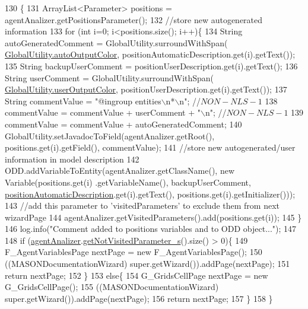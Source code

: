 \begin{DoxyCode}
130                                     \{ 
131         ArrayList<Parameter> positions = agentAnalizer.getPositionsParameter();
132         \textcolor{comment}{//store new autogenerated information}
133         \textcolor{keywordflow}{for} (\textcolor{keywordtype}{int} i=0; i<positions.size(); i++)\{
134             String autoGeneratedComment = GlobalUtility.surroundWithSpan(
      \hyperlink{classit_1_1isislab_1_1masonhelperdocumentation_1_1analizer_1_1_global_utility_a42aa676ad1ff27c42cd4aab651ff2a35}{GlobalUtility.autoOutputColor}, positionAutomaticDescription.get(i).getText());
135             String backupUserComment = positionUserDescription.get(i).getText();
136             String userComment = GlobalUtility.surroundWithSpan(
      \hyperlink{classit_1_1isislab_1_1masonhelperdocumentation_1_1analizer_1_1_global_utility_aec864cd710b27ece609c5a6093211ff4}{GlobalUtility.userOutputColor}, positionUserDescription.get(i).getText());
137             String commentValue = \textcolor{stringliteral}{"@ingroup entities\(\backslash\)n*\(\backslash\)n"}; \textcolor{comment}{//$NON-NLS-1$}
138             commentValue = commentValue + userComment + \textcolor{stringliteral}{"\(\backslash\)n"}; \textcolor{comment}{//$NON-NLS-1$}
139             commentValue = commentValue + autoGeneratedComment;
140             GlobalUtility.setJavadocToField(agentAnalizer.getRoot(), positions.get(i).getField(), 
      commentValue);
141             \textcolor{comment}{//store new autogenerated/user information in model description}
142             ODD.addVariableToEntity(agentAnalizer.getClassName(), \textcolor{keyword}{new} Variable(positions.get(i)
      .getVariableName(), backupUserComment, \hyperlink{classit_1_1isislab_1_1masonhelperdocumentation_1_1mason_1_1wizards_1_1_e___agent_position_page_ad8c6b4b4f5efd73f4e653ddeddd6bc2d}{positionAutomaticDescription}.get(i).getText(), 
      positions.get(i).getInitializer()));
143             \textcolor{comment}{//add this parameter to 'visitedParameters' to exclude them from next wizardPage}
144             agentAnalizer.getVisitedParameters().add(positions.get(i));
145         \}
146         log.info(\textcolor{stringliteral}{"Comment added to positions variables and to ODD object..."}); 
147         
148         \textcolor{keywordflow}{if} (\hyperlink{classit_1_1isislab_1_1masonhelperdocumentation_1_1mason_1_1wizards_1_1_e___agent_position_page_a2d464b9b75c99b576f5e23fc3b1d9c4a}{agentAnalizer}.\hyperlink{classit_1_1isislab_1_1masonhelperdocumentation_1_1analizer_1_1_agent_analizer_a9fdb36c2a505d7ad2459d70f413216d0}{getNotVisitedParameter\_s}().size() > 0)\{
149             F\_AgentVariablesPage nextPage = \textcolor{keyword}{new} F\_AgentVariablesPage();
150             ((MASONDocumentationWizard) super.getWizard()).addPage(nextPage);
151             \textcolor{keywordflow}{return} nextPage; 
152         \}
153         \textcolor{keywordflow}{else}\{
154             G\_GridsCellPage nextPage = \textcolor{keyword}{new} G\_GridsCellPage();
155             ((MASONDocumentationWizard) super.getWizard()).addPage(nextPage);
156             \textcolor{keywordflow}{return} nextPage; 
157         \}
158     \}
\end{DoxyCode}


